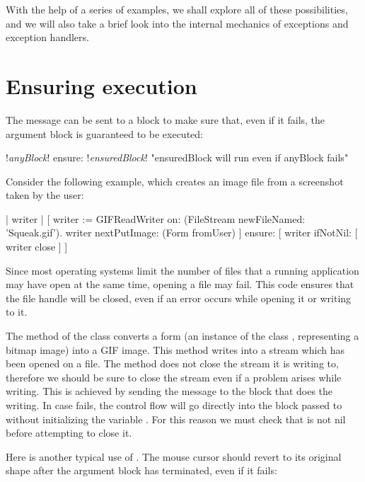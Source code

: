 \documentclass[a4paper,10pt,twoside]{book}
\begin{document}
With the help of a series of examples, we shall explore all of these possibilities, and we will also take a brief look into the internal mechanics of exceptions and exception handlers.

\section{Ensuring execution}

The  message can be sent to a block to make sure that, even if it fails, the argument block is guaranteed to be executed:
\begin{code}{}
!\emph{anyBlock}! ensure: !\emph{ensuredBlock}!    "ensuredBlock will run even if anyBlock fails"
\end{code}

Consider the following example, which creates an image file from a screenshot taken by the user:

\begin{code}{}
| writer |
[	writer := GIFReadWriter on: (FileStream newFileNamed: 'Squeak.gif').
	writer nextPutImage: (Form fromUser)
]	ensure: [ writer ifNotNil: [ writer close ] ]
\end{code}

Since most operating systems limit the number of files that a running application may have open at the same time, opening a file may fail.
This code ensures that the  file handle will be closed, even if an error occurs while opening it or writing to it.

The  method of the class  converts a form (\ie an instance of the class , representing a bitmap image) into a GIF image. This method writes into a stream which has been opened on a file. The  method does not close the stream it is writing to, therefore we should be sure to close the stream even if a problem arises while writing. This is achieved by sending the message  to the block that does the writing. In case  fails, the control flow will go directly into the block passed to  without initializing the variable . For this reason we must check that  is not nil before attempting to close it.

Here is another typical use of .
The mouse cursor should revert to its original shape after the argument block has terminated, even if it fails:
\end{document}

